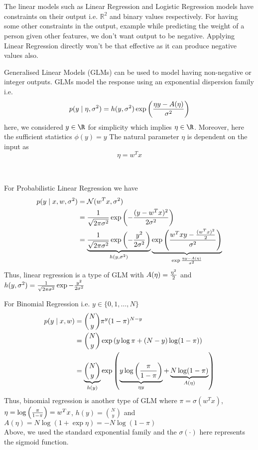 \documentclass{homework}
\begin{document}
\section{}
The linear models such as Linear Regression and Logistic Regression models have constraints on their output i.e. $\mathbb R^2$ and binary values respectively. For having some other constraints in the output, example while predicting the weight of a person given other features, we don't want output to be negative. Applying Linear Regression directly won't be that effective as it can produce negative values also.

Generalised Linear Models (GLMs) can be used to model having non-negative or integer outputs. GLMs model the response using an exponential dispersion family i.e. 
$$
p(y\mid \eta, \sigma^2) = h(y, \sigma^2)\exp\left(\eta y - A(\eta) \over \sigma^2\right)
$$
here, we considered $y\in \R$ for simplicity which implies $\eta \in \R$. Moreover, here the sufficient statistics $\phi(y) = y$
The natural parameter $\eta$ is dependent on the input as 
$$
\eta = w^Tx
$$

\subsection{} \\

For Probabilistic Linear Regression we have 
$$
\begin{aligned}
p(y\mid x, w, \sigma^2) &= \mathcal N(w^Tx, \sigma^2)\\
&= {1\over \sqrt{2\pi \sigma^2}}\exp\left(-{(y - w^Tx)^2 \over 2\sigma^2}\right)\\
&= \underbrace{{1\over \sqrt{2\pi \sigma^2}}\exp\left(-{y^2\over 2\sigma^2} \right)}_{h(y,\sigma^2)}\underbrace{\exp\left({{w^Txy - {(w^Tx)^2 \over 2}\over \sigma^2}}\right)}_{\exp{\eta y - A(\eta) \over \sigma^2}}
\end{aligned}
$$
Thus, linear regression is a type of GLM with $A(\eta) = {\eta^2 \over 2}$ and $h(y,\sigma^2) = {1\over \sqrt{2\pi \sigma^2}}\exp-{y^2\over 2\sigma^2} $ 

For Binomial Regression i.e. $y\in \{0,1,\dots, N\}$
$$
\begin{aligned}
p(y\mid x, w) &= \binom{N}{y} \pi^y(1-\pi)^{N-y}\\
&= \binom{N}{y} \exp\left(y\log \pi + (N - y)\log (1-\pi)\right)\\
&= \underbrace{\binom{N}{y}}_{h(y)} \exp\left(\underbrace{y\log \left(\pi\over 1-\pi\right)}_{\eta y} + \underbrace{N\log (1-\pi)}_{A(\eta)}\right)\\
\end{aligned}
$$
Thus, binomial regression is another type of GLM where $\pi = \sigma(w^Tx)$, $\eta = \log\left(\pi \over 1-\pi\right) = w^Tx$, $h(y) = \binom{N}{y}$ and $A(\eta) = N \log (1 + \exp \eta) = -N\log (1 - \pi)$ \\
Above, we used the standard exponential family and the $\sigma(\cdot)$ here represents the sigmoid function.
\end{document}
